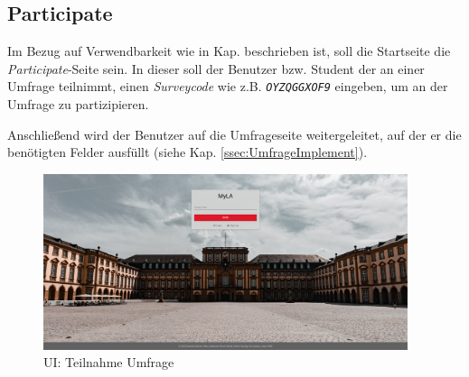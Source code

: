 \subsection{Participate}
Im Bezug auf Verwendbarkeit wie in Kap.  beschrieben ist, soll die Startseite die \emph{Participate}-Seite sein. 
In dieser soll der Benutzer bzw. Student der an einer Umfrage teilnimmt, einen \emph{Surveycode} wie z.B. \emph{\texttt{OYZQGGXOF9}} eingeben, um an der Umfrage zu partizipieren. 

Anschließend wird der Benutzer auf die Umfrageseite weitergeleitet, auf der er die benötigten Felder ausfüllt (siehe Kap. \vref{ssec:UmfrageImplement}).

\begin{figure}[hp]
	\centering
	\includegraphics[width=0.95\textwidth, keepaspectratio]{img/client/Participate.png}
	\captionsetup{justification=centering, format=plain}
	\caption[\acf{UI}: Teilnahme Umfrage]{\acf{UI}: Teilnahme Umfrage \\ \quelleScreenshot}
	\label{fig:ParticipateImplement}
\end{figure}